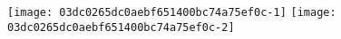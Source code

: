 \texttt{[image: 03dc0265dc0aebf651400bc74a75ef0c-1]}%
\ifx\betweenLilyPondSystem \undefined
  \linebreak
\else
  \expandafter{}%
\fi
\texttt{[image: 03dc0265dc0aebf651400bc74a75ef0c-2]}%
